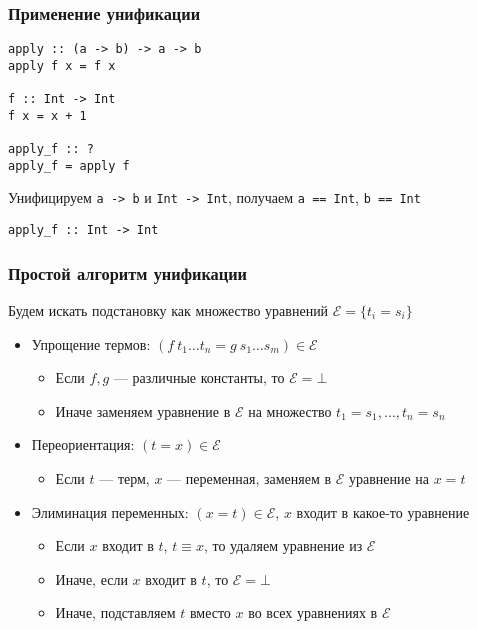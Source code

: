 \documentclass[aspectratio=169]{beamer}
\begin{document}
\begin{frame}[fragile]
  \frametitle{Применение унификации}
\begin{verbatim}
apply :: (a -> b) -> a -> b
apply f x = f x

f :: Int -> Int
f x = x + 1

apply_f :: ?
apply_f = apply f
\end{verbatim}

\bigskip

Унифицируем \verb!a -> b! и \verb!Int -> Int!, получаем \verb!a == Int!, \verb!b == Int!

\bigskip

\verb!apply_f :: Int -> Int!
\end{frame}



\begin{frame}[fragile]
  \frametitle{Простой алгоритм унификации}

\begin{center}
  Будем искать подстановку как множество уравнений $\mathcal{E} = \{ t_i = s_i \}$
\end{center}

\begin{itemize}
  \item Упрощение термов: $(f \ t_1 \dots t_n = g \ s_1 \dots s_m) \in \mathcal{E}$
  \begin{itemize}
    \item Если $f, g$ --- различные константы, то $\mathcal{E} = \bot$
    \item Иначе заменяем уравнение в $\mathcal{E}$ на множество $t_1 = s_1, \dots, t_n = s_n$
  \end{itemize}
  \item Переориентация: $(t = x) \in \mathcal{E}$
  \begin{itemize}
    \item Если $t$ --- терм, $x$ --- переменная, заменяем в $\mathcal{E}$ уравнение на $x = t$
  \end{itemize}
  \item Элиминация переменных: $(x = t) \in \mathcal{E}$, $x$ входит в какое-то уравнение
  \begin{itemize}
    \item Если $x$ входит в $t$, $t \equiv x$, то удаляем уравнение из $\mathcal{E}$
    \item Иначе, если $x$ входит в $t$, то $\mathcal{E} = \bot$
    \item Иначе, подставляем $t$ вместо $x$ во всех уравнениях в $\mathcal{E}$
  \end{itemize}
\end{itemize}

\end{frame}
\end{document}
